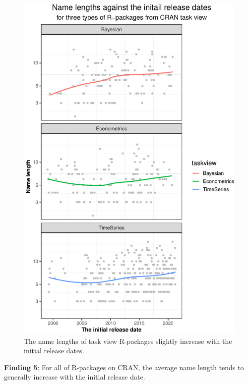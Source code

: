 \documentclass[
]{book}
\newenvironment{discovery}[1]{%
  \begin{tcolorbox}[colback=blue!30,colframe=blue!80!black]#1}{\end{tcolorbox}}
\begin{document}
\begin{figure}

{\centering \includegraphics{figures/namelth-taskview-1} 

}

\caption{The name lengths of task view R-packages slightly increase with the initial release dates.}\label{fig:namelth-taskview}
\end{figure}

\begin{discovery}
\textbf{Finding 5}: For all of R-packages on CRAN, the average name
length tends to generally increase with the initial release date.
\end{discovery}
\end{document}

